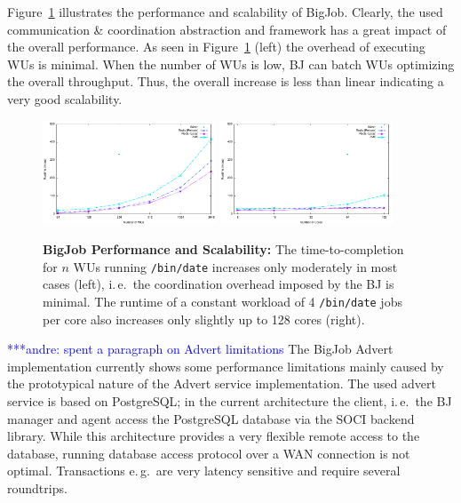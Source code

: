 \documentclass[conference,final]{IEEEtran}
\newcommand{\alnote}[1]{ {\textcolor{blue} { ***andre: #1 }}}
\newcommand{\alnote}[1]{}
\begin{document}
Figure~\ref{fig:perf_bigjob-varying-wus} illustrates the performance and 
scalability of BigJob. Clearly, the used communication \& coordination 
abstraction and framework has a great impact of the overall performance. As 
seen in Figure~\ref{fig:perf_bigjob-varying-wus} (left) the overhead of 
executing WUs is minimal. When the number of WUs is low, BJ can batch WUs optimizing the overall throughput.  Thus, the overall increase is less than linear indicating a very good scalability.

\begin{figure}[htbp] \centering
\includegraphics[width=0.46\textwidth]{perf/bigjob-varying-wus-alamo.pdf}\qquad
\includegraphics[width=0.46\textwidth]{perf/bigjob-varying-cores-alamo.pdf}
\caption{\textbf{BigJob Performance and Scalability:} The time-to-completion
for $n$ WUs running \texttt{/bin/date} increases only moderately in most cases
(left), i.\,e.\ the coordination overhead imposed by the BJ is minimal. The
runtime of a constant workload of 4 \texttt{/bin/date} jobs per core also
increases only slightly up to 128 cores (right). }
\label{fig:perf_bigjob-varying-wus} \end{figure}

\alnote{spent a paragraph on Advert limitations}
The BigJob Advert implementation currently shows some performance limitations
mainly caused by the prototypical nature of the Advert service implementation.
The used advert service is based on PostgreSQL; in the current architecture
the client, i.\,e.\ the BJ manager and agent access the PostgreSQL database
via the SOCI backend library. While this architecture provides a very flexible
remote access to the database, running database access protocol over a WAN
connection is not optimal. Transactions e.\,g.\ are very latency sensitive and
require several roundtrips.
\end{document}
